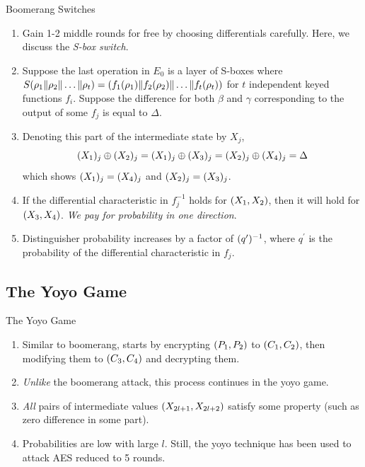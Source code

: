 \documentclass[notheorems]{beamer}
\theoremstyle{definition}
\theoremstyle{example}
\begin{document}
    \begin{frame}[<+->]{Boomerang Switches}
        \begin{enumerate}
            \item Gain 1-2 middle rounds for free by choosing differentials
            carefully. Here, we discuss the \emph{S-box switch}.
            \item Suppose the last operation in \(E_0\) is a layer of S-boxes
            where \(S(\rho_1\|\rho_2\|\ldots\|\rho_t) =
            (f_1(\rho_1)\|f_2(\rho_2)\|\ldots\|f_t(\rho_t))\)             
            for \(t\) independent keyed functions \(f_i\). Suppose the
            difference for both \(\beta\) and \(\gamma\) corresponding to the
            output of some \(f_j\) is equal to \(\Delta\). 
            \item Denoting this part of the intermediate state by \(X_j\),
            \begin{equation}
                (X_1)_j \oplus (X_2)_j = (X_1)_j \oplus (X_3)_j = (X_2)_j \oplus (X_4)_j = \Delta
                \label{eq:s-switch}
            \end{equation}
            which shows \((X_1)_j = (X_4)_j\) and \((X_2)_j =
            (X_3)_j\).
            \item If the differential characteristic in \(f_j^{-1}\) holds for
            \((X_1, X_2)\), then it will hold for \((X_3, X_4)\).
            \emph{We pay for probability in one direction}.
            \item Distinguisher probability increases by a factor of
            \((q^\prime)^{-1}\), where \(q^\prime\) is the probability of
            the differential characteristic in \(f_j\).
        \end{enumerate}
    \end{frame}

    \subsection{The Yoyo Game}
    \label{subsec:yoyo-game}
    
    \begin{frame}[<+->]{The Yoyo Game}
        \begin{enumerate}
            \item Similar to boomerang, starts by encrypting \((P_1, P_2)\)
            to \((C_1, C_2)\), then modifying them to \((C_3, C_4)\)
            and decrypting them.
            \item \emph{Unlike} the boomerang attack, this process continues in
            the yoyo game.
            \item \emph{All} pairs of intermediate values \((X_{2l + 1},
            X_{2l + 2})\) satisfy some property (such as zero difference in some
            part).
            \item Probabilities are low with large \(l\). Still, the yoyo
            technique has been used to attack AES reduced to 5 rounds.
        \end{enumerate}
    \end{frame}
\end{document}
